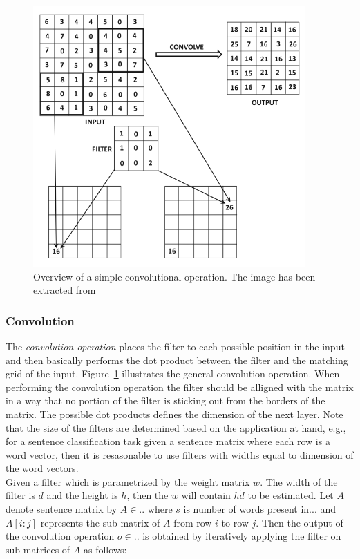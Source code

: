 \begin{figure}[t]
\centering
 \includegraphics[height=10cm,width=\linewidth]{Figures/fig_cnn_convolution.png}
 \caption{Overview of a simple convolutional operation. The image has been extracted from}
 \label{fig:cnn_convolution}
\end{figure}

\subsubsection{Convolution}
The \textit{convolution operation} places the filter to each possible position in the input and then basically performs the dot product between the filter and the matching grid of the input. Figure~\ref{fig:cnn_convolution} illustrates the general convolution operation. When performing the convolution operation the filter should be alligned with the matrix in a way that no portion of the filter is sticking out from the borders of the matrix. The possible dot products defines the dimension of the next layer. Note that the size of the filters are determined based on the application at hand, e.g., for a sentence classification task given a sentence matrix where each row is a word vector, then it is resasonable to use filters with widths equal to dimension of the word vectors. \\
Given a filter which is parametrized by the weight matrix $w$. The width of the filter is $d$ and the height is $h$, then the $w$ will contain $h \dot d$ to be estimated. Let $A$ denote sentence matrix by $A \in ..$ where $s$ is number of words present in... and $A[i:j]$ represents the sub-matrix of $A$ from row $i$ to row $j$. Then the output of the convolution operation $o \in ..$ is obtained by iteratively applying the filter on sub matrices of $A$ as follows:

